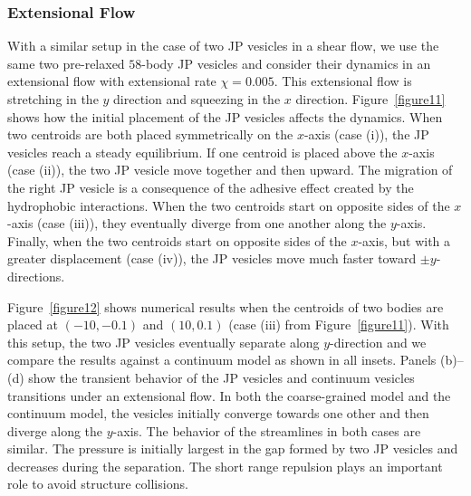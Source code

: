 \documentclass[lineno]{jfm}
\begin{document}
\subsubsection{Extensional Flow}

With a similar setup in the case of two JP vesicles in a shear flow,
we use the same two pre-relaxed $58$-body JP vesicles and consider
their dynamics in an extensional flow with extensional rate
$\chi=0.005$. This extensional flow is stretching in the $y$ direction
and squeezing in the $x$ direction. Figure~\ref{figure11} shows how the
initial placement of the JP vesicles affects the dynamics. When two
centroids are both placed symmetrically on the $x$-axis (case (i)), the
JP vesicles reach a steady equilibrium. If one centroid is placed
above the $x$-axis (case (ii)), the two JP vesicle move together and
then upward. The migration of the right JP vesicle is a consequence
of the adhesive effect created by the hydrophobic interactions. When the
two centroids start on opposite sides of the $x$-axis (case (iii)), they
eventually diverge from one another along the $y$-axis. Finally, when
the two centroids start on opposite sides of the $x$-axis, but with a
greater displacement (case (iv)), the JP vesicles move much faster
toward $\pm y$-directions.

Figure~\ref{figure12} shows numerical results when the centroids of two
bodies are placed at $(-10,-0.1)$ and $(10,0.1)$ (case (iii) from
Figure~\ref{figure11}). With this setup, the two
JP vesicles eventually separate along $y$-direction and we compare
the results against a continuum model as shown in all insets.  Panels
(b)--(d) show the transient behavior of the JP vesicles and continuum
vesicles transitions under an extensional flow. In both the
coarse-grained model and the continuum model, the vesicles initially
converge towards one other and then diverge along the $y$-axis. The
behavior of the streamlines in both cases are similar. The pressure is
initially largest in the gap formed by two JP vesicles and decreases
during the separation. The short range repulsion plays an important role
to avoid structure collisions.






\end{document}
